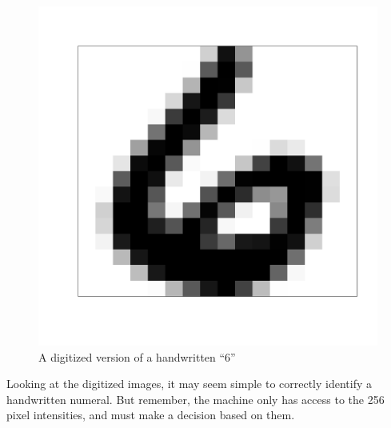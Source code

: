 \documentclass[12pt,oneside]{book}\usepackage[]{graphicx}\usepackage[]{color}
\makeatletter
\def\maxwidth{ %
  \ifdim\Gin@nat@width>\linewidth
    \linewidth
  \else
    \Gin@nat@width
  \fi
}
\newenvironment{knitrout}{}{} %
\makeatother
\begin{document}
\begin{figure}[H]
\centering
\begin{knitrout}
\color{fgcolor}
\includegraphics[width=\maxwidth]{figure/unnamed-chunk-11-1} 

\end{knitrout}
\caption{A digitized version of a handwritten ``6''}
\label{FIG:DIGIT}
\end{figure}





Looking at the digitized images, it may seem simple to correctly identify a handwritten numeral. But remember, the machine only has access to the 256 pixel intensities, and must make a decision based on them. 
\end{document}
